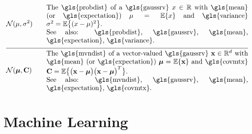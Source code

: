 \newpage
\begin{align} 
	&\mathcal{N}(\mu, \sigma^{2}) &\quad & \parbox{.85\textwidth}{The \gls{probdist} of a 
		\gls{gaussrv} $\feature \in \mathbb{R}$ with \gls{mean} (or \gls{expectation}) $\mu= \expect \{ \feature \}$ 
		and \gls{variance} $\sigma^{2} =   \expect \big\{  (  \feature - \mu )^2 \big\}$.
		\\ See also: \gls{probdist}, \gls{gaussrv}, \gls{mean}, \gls{expectation}, \gls{variance}.} \nonumber \\[2mm] \hline \nonumber\\[-5mm]
	&\mathcal{N}(\meanvecgeneric, \mathbf{C}) &\quad & \parbox{.85\textwidth}{The \gls{mvndist} of a vector-valued 
		\gls{gaussrv} $\featurevec \in \mathbb{R}^{\featuredim}$ with \gls{mean} (or \gls{expectation}) $\clustermean= \expect \{ \featurevec \}$ 
		and \gls{covmtx} $\mathbf{C} =  \expect \big\{ \big( \featurevec - \clustermean \big)\big( \featurevec - \clustermean \big)^{T} \big\}$.
		\\ See also: \gls{mvndist}, \gls{gaussrv}, \gls{mean}, \gls{expectation}, \gls{covmtx}.} \nonumber                                             
\end{align}





\newpage
\section*{Machine Learning}

